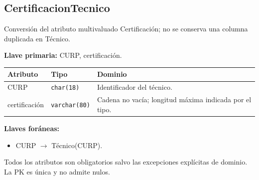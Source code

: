 \par\noindent\begin{minipage}{\textwidth}
\subsection{CertificacionTecnico}
Conversión del atributo multivaluado Certificación; no se conserva una columna duplicada en Técnico.\par
\textbf{Llave primaria:} CURP, certificación.\par
{\small\begin{tabular}{@{}p{}p{}p{}@{}}
\toprule Atributo & Tipo & Dominio \\ \midrule
CURP & \texttt{char(18)} & Identificador del técnico. \\
certificación & \texttt{varchar(80)} & Cadena no vacía; longitud máxima indicada por el tipo. \\
\bottomrule\end{tabular}}
\textbf{Llaves foráneas:}\begin{itemize}[nosep]
\item CURP $\rightarrow$ Técnico(CURP).
\end{itemize}
Todos los atributos son obligatorios salvo las excepciones explícitas de dominio. La PK es única y no admite nulos.
\end{minipage}\par\vspace{.35cm}
